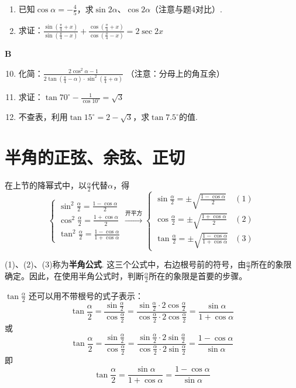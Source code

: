 \begin{enumerate}
\item 已知$\cos\alpha=-\frac{4}{5}$，求$\sin2\alpha$、$\cos2\alpha$（注意与题4对比）.
\item 求证：$\frac{\sin\left(\frac{\pi}{4}+x\right)}{\sin\left(\frac{\pi}{4}-x\right)}+\frac{\cos\left(\frac{\pi}{4}+x\right)}{\cos\left(\frac{\pi}{4}-x\right)}=2\sec 2x$

\end{enumerate}

\begin{center}
    \bfseries B
\end{center}
\begin{enumerate}\setcounter{enumi}{9}
    \item 化简：$\frac{2\cos^2\alpha-1}{2\tan\left(\frac{\pi}{4}-\alpha\right)\cdot \sin^2 \left(\frac{\pi}{4}+\alpha\right)}$
（注意：分母上的角互余）

\item 求证：$\tan70^{\circ}-\frac{1}{\cos 10^{\circ}}=\sqrt{3}$
\item 不查表，利用$\tan15^{\circ}=2-\sqrt{3}$，求$\tan 7.5^{\circ}$的值.

\end{enumerate}


\section{半角的正弦、余弦、正切}
在上节的降幂式中，以$\frac{\alpha}{2}$代替$\alpha$，得
\[\begin{cases}
\sin^2\frac{\alpha}{2}=\frac{1-\cos\alpha}{2}\\[1.5ex]
\cos^2\frac{\alpha}{2}=\frac{1+\cos\alpha}{2}\\[1.5ex]
\tan^2\frac{\alpha}{2}=\frac{1-\cos\alpha}{1+\cos\alpha}
\end{cases}\xrightarrow[]{\text{开平方}}\begin{cases}
    \sin\frac{\alpha}{2}=\pm\sqrt{\frac{1-\cos\alpha}{2}}&(1)\\[1.5ex]
\cos\frac{\alpha}{2}=\pm\sqrt{\frac{1+\cos\alpha}{2}}&(2)\\[1.5ex]
\tan\frac{\alpha}{2}=\pm\sqrt{\frac{1-\cos\alpha}{1+\cos\alpha}}&(3)
\end{cases}\]

(1)、(2)、(3)称为\textbf{半角公式}. 这三个公式中，右边根号前的符号，由$\frac{\alpha}{2}$所在的象限确定。因此，在使用半角公式时，判断$\frac{\alpha}{2}$所在的象限是首要的步骤。

$\tan\frac{\alpha}{2}$
还可以用不带根号的式子表示：
\[\tan\frac{\alpha}{2}=\frac{\sin\frac{\alpha}{2}}{\cos\frac{\alpha}{2}}=\frac{\sin\frac{\alpha}{2}\cdot 2\cos \frac{\alpha}{2}}{\cos \frac{\alpha}{2}\cdot 2\cos\frac{\alpha}{2}}=\frac{\sin\alpha}{1+\cos\alpha}\]
或
\[\tan\frac{\alpha}{2}=\frac{\sin\frac{\alpha}{2}}{\cos\frac{\alpha}{2}}=\frac{\sin\frac{\alpha}{2}\cdot 2\sin \frac{\alpha}{2}}{\cos \frac{\alpha}{2}\cdot 2\sin\frac{\alpha}{2}}=\frac{1-\cos\alpha}{\sin\alpha}\]
即
\begin{equation}
\tan\frac{\alpha}{2}=\frac{\sin\alpha}{1+\cos\alpha}=\frac{1-\cos\alpha}{\sin\alpha}\tag{4}
\end{equation}

